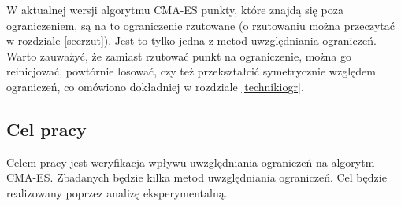 \documentclass{mini}
\begin{document}
W aktualnej wersji algorytmu CMA-ES punkty, które znajdą się poza ograniczeniem, są na to ograniczenie rzutowane (o rzutowaniu można przeczytać w rozdziale \ref{secrzut}). Jest to tylko jedna z metod uwzględniania ograniczeń. Warto zauważyć, że zamiast rzutować punkt na ograniczenie, można go reinicjować, powtórnie losować, czy też przekształcić symetrycznie względem ograniczeń, co omówiono dokładniej w rozdziale \ref{technikiogr}.

\subsection*{Cel pracy}
\hspace{3,4ex}Celem pracy jest weryfikacja wpływu uwzględniania ograniczeń na algorytm CMA-ES. Zbadanych będzie kilka metod uwzględniania ograniczeń. Cel będzie realizowany poprzez analizę eksperymentalną.

\pagebreak
\end{document}
